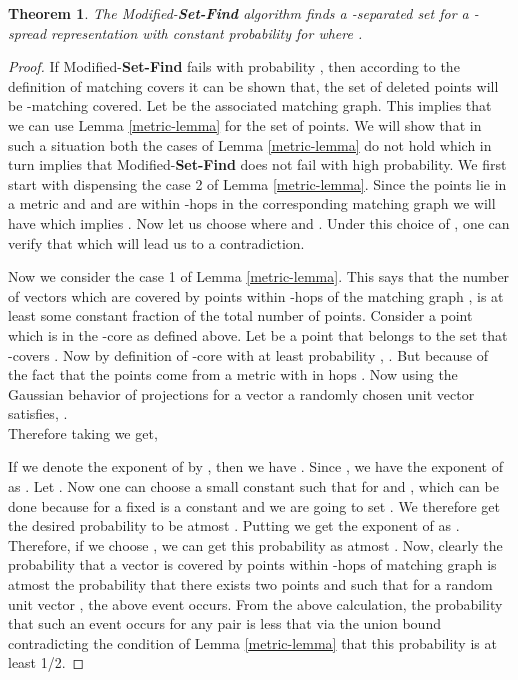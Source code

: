 \documentclass [11pt,a4paper]{article}
\newtheorem{theorem}{Theorem}
\begin{document}
\begin{theorem}\label{main}
The \mbox{{\sc Modified}-\textbf{Set-Find}} algorithm finds a -separated set for a -spread  representation
with constant probability for  where .
\end{theorem}
\begin{proof}
If {\sc Modified}-\textbf{Set-Find} fails with probability ,
then according to the definition of matching covers it can be shown that,
the set of deleted points will be -matching covered. Let  be the 
associated matching graph. This implies that 
we can use Lemma \ref{metric-lemma} for the set of points. We will show that 
in such a situation both the cases of Lemma \ref{metric-lemma}
do not hold which in turn implies that {\sc Modified}-\textbf{Set-Find} does not fail with high probability. 
We first start with dispensing the case 2 of Lemma \ref{metric-lemma}. Since the points lie in a  metric
and  and  are within -hops in the corresponding matching graph  we will have
 which implies . Now let us 
choose  where  and 
. Under this choice of , 
one can verify that  
which will lead us to a contradiction. 

Now we consider the case 1 of Lemma \ref{metric-lemma}. This says that the number of vectors
which are  covered by points within -hops
of the matching graph , is at least some constant fraction of the total number of points. Consider 
a point  which is in the -core as defined above. Let  be a point that belongs to the 
set that -covers . Now by definition of -core  
with at least probability , .
But because of the fact that the points come from a  metric with in  hops 
. Now using the Gaussian behavior of projections for a 
vector  a randomly chosen unit vector  satisfies, 
. \\
Therefore taking  we get,

If we denote the exponent of  by , then we have
.
Since , we have the exponent of  as
.
Let .
Now one can choose a small constant  such that  for  and , 
which can be done because for a fixed   is a constant and we are going to set .
We therefore get the desired probability to be atmost
. Putting  we get the exponent of  as 
.
Therefore, if we choose , we can get this probability as atmost .
Now, clearly the probability that a vector  is covered by points within -hops of matching graph is atmost the probability
that there exists two points  and  such that for a random unit vector , the above event occurs.
From the above calculation, the probability that such an event occurs for any pair  is 
less that  via the union bound contradicting the condition of Lemma \ref{metric-lemma} that this probability is at least 1/2.
\end{proof}
\end{document}
